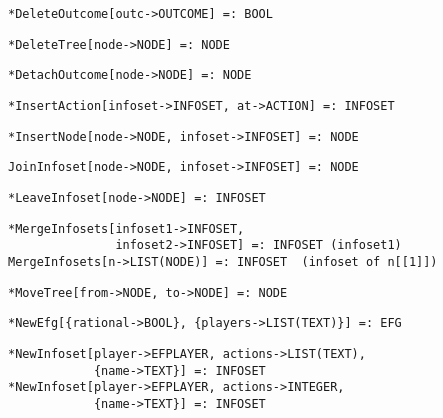 \protect \large \begin{verbatim}
*DeleteOutcome[outc->OUTCOME] =: BOOL
\end{verbatim}\normalsize

\protect \large \begin{verbatim}
*DeleteTree[node->NODE] =: NODE
\end{verbatim}\normalsize

\protect \large \begin{verbatim}
*DetachOutcome[node->NODE] =: NODE
\end{verbatim}\normalsize

\protect \large \begin{verbatim}
*InsertAction[infoset->INFOSET, at->ACTION] =: INFOSET 
\end{verbatim}\normalsize

\protect \large \begin{verbatim}
*InsertNode[node->NODE, infoset->INFOSET] =: NODE
\end{verbatim}\normalsize

\protect \large \begin{verbatim}
JoinInfoset[node->NODE, infoset->INFOSET] =: NODE
\end{verbatim}\normalsize

\protect \large \begin{verbatim}
*LeaveInfoset[node->NODE] =: INFOSET
\end{verbatim}\normalsize


\protect \large \begin{verbatim}
*MergeInfosets[infoset1->INFOSET,
               infoset2->INFOSET] =: INFOSET (infoset1)
MergeInfosets[n->LIST(NODE)] =: INFOSET  (infoset of n[[1]])
\end{verbatim}\normalsize


\protect \large \begin{verbatim}
*MoveTree[from->NODE, to->NODE] =: NODE
\end{verbatim}\normalsize

\protect \large \begin{verbatim} 
*NewEfg[{rational->BOOL}, {players->LIST(TEXT)}] =: EFG
\end{verbatim}\normalsize


\protect \large \begin{verbatim} 
*NewInfoset[player->EFPLAYER, actions->LIST(TEXT),
            {name->TEXT}] =: INFOSET
*NewInfoset[player->EFPLAYER, actions->INTEGER,
            {name->TEXT}] =: INFOSET
\end{verbatim}\normalsize

